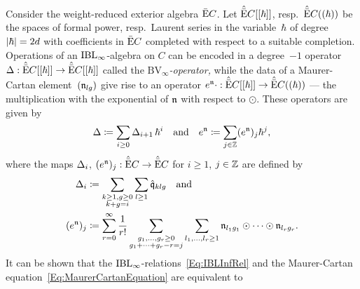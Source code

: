 \documentclass[\MainFolder/Text.tex]{subfiles}
\begin{document}
\begin{Remark}\label{Rem:BVForm}
Consider the weight-reduced exterior algebra $\bar{\mathrm{E}} C$. Let $\hat{\bar{\mathrm{E}}} C[[\hbar]]$, resp.~$\hat{\bar{\mathrm{E}}} C((\hbar))$ be the spaces of formal power, resp.~Laurent series in the variable~$\hbar$ of degree $|\hbar| = 2d$ with coefficients in $\bar{\mathrm{E}} C$ completed with respect to a suitable completion.
Operations of an $\mathrm{IBL}_\infty$-algebra on $C$ can be encoded in a degree~$-1$ operator $\operatorname{\Delta}: \hat{\bar{\mathrm{E}}} C[[\hbar]] \rightarrow \hat{\bar{\mathrm{E}}} C[[\hbar]]$ called the \emph{$\mathrm{BV}_\infty$-operator,} while the data of a Maurer-Cartan element~$(\mathfrak{n}_{lg})$ give rise to an operator $e^{\mathfrak{n}}\cdot: \hat{\bar{\mathrm{E}}} C[[\hbar]] \rightarrow \hat{\bar{\mathrm{E}}} C((\hbar))$ --- the multiplication with the exponential of $\mathfrak{n}$ with respect to $\odot$. These operators are given by
$$ \operatorname{\Delta} \coloneqq \sum_{i\ge 0}\operatorname{\Delta}_{i+1} \hbar^{i}\quad\text{and}\quad e^{\mathfrak{n}} \coloneqq \sum_{j\in \mathbb{Z}} (e^{\mathfrak{n}})_j \hbar^{j}, $$
where the maps $\operatorname{\Delta}_i$, $(e^{\mathfrak{n}})_j: \hat{\bar{\mathrm{E}}} C\rightarrow \hat{\bar{\mathrm{E}}} C$ for $i\ge 1$, $j\in \mathbb{Z}$ are defined by 
$$\begin{aligned}
\operatorname{\Delta}_i & \coloneqq \sum_{\substack{k\ge 1, g\ge 0 \\k+g=i}} \sum_{l\ge 1} \hat{\mathfrak{q}}_{klg}\quad\text{and} \\
(e^{\mathfrak{n}})_j &\coloneqq \sum_{r=0}^\infty \frac{1}{r!} \sum_{\substack{g_1, \dotsc, g_r \ge 0 \\ g_1 + \dotsb +g_r - r= j }} \sum_{l_1, \dotsc, l_r\ge 1} \mathfrak{n}_{l_1 g_1} \odot \dotsb \odot \mathfrak{n}_{l_r g_r}.
\end{aligned}$$
It can be shown that the $\mathrm{IBL}_\infty$-relations~\eqref{Eq:IBLInfRel} and the Maurer-Cartan equation~\eqref{Eq:MaurerCartanEquation} are equivalent to  

\end{Remark}
\end{document}
